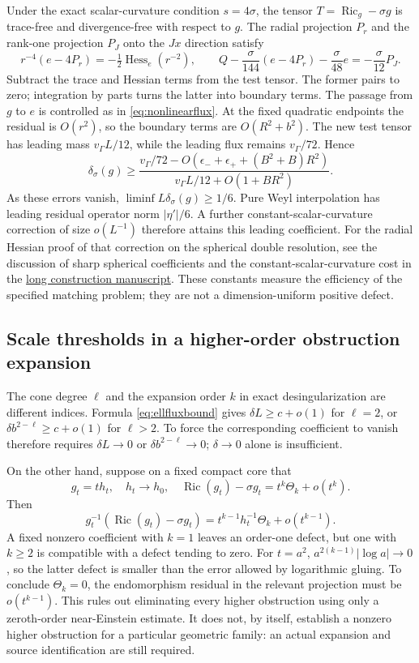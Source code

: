 \documentclass[a4paper,11pt]{article}
\numberwithin{equation}{section}
\theoremstyle{definition}
\newcommand{\Ric}{\operatorname{Ric}}
\begin{document}
Under the exact scalar-curvature condition $s=4\sigma$, the tensor $T=\Ric_g-\sigma g$ is trace-free and divergence-free with respect to $g$.
The radial projection $P_r$ and the rank-one projection $P_J$ onto the $Jx$ direction satisfy
\[
r^{-4}(e-4P_r)=-\tfrac12\operatorname{Hess}_e(r^{-2}),\qquad
Q-\frac{\sigma}{144}(e-4P_r)-\frac{\sigma}{48}e=-\frac{\sigma}{12}P_J.
\]
Subtract the trace and Hessian terms from the test tensor. The former pairs to zero; integration by parts turns the latter into boundary terms.
The passage from $g$ to $e$ is controlled as in \eqref{eq:nonlinearflux}.
At the fixed quadratic endpoints the residual is $O(r^2)$, so the boundary terms are $O(R^2+b^2)$.
The new test tensor has leading mass $v_\Gamma L/12$, while the leading flux remains $v_\Gamma/72$. Hence
\[
\delta_\sigma(g)\ge
\frac{v_\Gamma/72-O(\epsilon_-+\epsilon_++(B^2+B)R^2)}
{v_\Gamma L/12+O(1+BR^2)}.
\]
As these errors vanish, $\liminf L\delta_\sigma(g)\ge1/6$.
Pure Weyl interpolation has leading residual operator norm $|\eta'|/6$.
A further constant-scalar-curvature correction of size $o(L^{-1})$ therefore attains this leading coefficient.
For the radial Hessian proof of that correction on the spherical double resolution, see
the discussion of sharp spherical coefficients and the constant-scalar-curvature cost in the \href{20260912.tex}{long construction manuscript}.
These constants measure the efficiency of the specified matching problem; they are not a dimension-uniform positive defect.

\subsection{Scale thresholds in a higher-order obstruction expansion}
The cone degree $\ell$ and the expansion order $k$ in exact desingularization are different indices.
Formula \eqref{eq:ellfluxbound} gives
$\delta L\ge c+o(1)$ for $\ell=2$, or
$\delta b^{2-\ell}\ge c+o(1)$ for $\ell>2$.
To force the corresponding coefficient to vanish therefore requires $\delta L\to0$ or
$\delta b^{2-\ell}\to0$; $\delta\to0$ alone is insufficient.

On the other hand, suppose on a fixed compact core that
\[
g_t=t h_t,\quad h_t\to h_0,\quad
\Ric(g_t)-\sigma g_t=t^k\Theta_k+o(t^k).
\]
Then
\[
g_t^{-1}(\Ric(g_t)-\sigma g_t)
=t^{k-1}h_t^{-1}\Theta_k+o(t^{k-1}).
\]
A fixed nonzero coefficient with $k=1$ leaves an order-one defect, but one with $k\ge2$ is compatible with a defect tending to zero.
For $t=a^2$, $a^{2(k-1)}|\log a|\to0$, so the latter defect is smaller than the error allowed by logarithmic gluing.
To conclude $\Theta_k=0$, the endomorphism residual in the relevant projection must be $o(t^{k-1})$.
This rules out eliminating every higher obstruction using only a zeroth-order near-Einstein estimate.
It does not, by itself, establish a nonzero higher obstruction for a particular geometric family: an actual expansion and source identification are still required.
\end{document}
